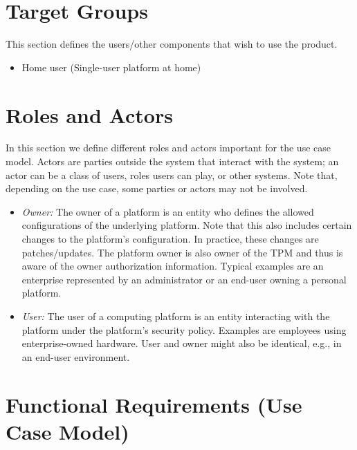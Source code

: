 \documentclass[
  american        %
]{sirrixreport}
\begin{document}
\section{Target Groups}
 This section defines the users/other components that wish to use the product.

\begin{itemize}
 \item Home user (Single-user platform at home)
\end{itemize}

\section{Roles and Actors}
 In this section we define different roles and actors important for the use case model. Actors are parties outside the system that interact with the system; an actor can be a class of users, roles users can play, or other systems. Note that, depending on the use case, some parties or actors may not be involved.

\begin{itemize}
 \item \emph{Owner:} The owner of a platform is an entity who defines the allowed configurations of the underlying platform. Note that this also includes certain changes to the platform's configuration.  In practice, these changes are patches/updates. The platform owner is also owner of the TPM and thus is aware of the owner authorization information. Typical examples are an enterprise represented by an administrator or an end-user owning a personal platform.
 \item \emph{User:} The user of a computing platform is an entity interacting with the platform under the platform's security policy. Examples are employees using enterprise-owned hardware. User and owner might also be identical, e.g., in an end-user environment.
\end{itemize}

\section{Functional Requirements (Use Case Model)}
\label{sec:functional.requirements}
\end{document}

